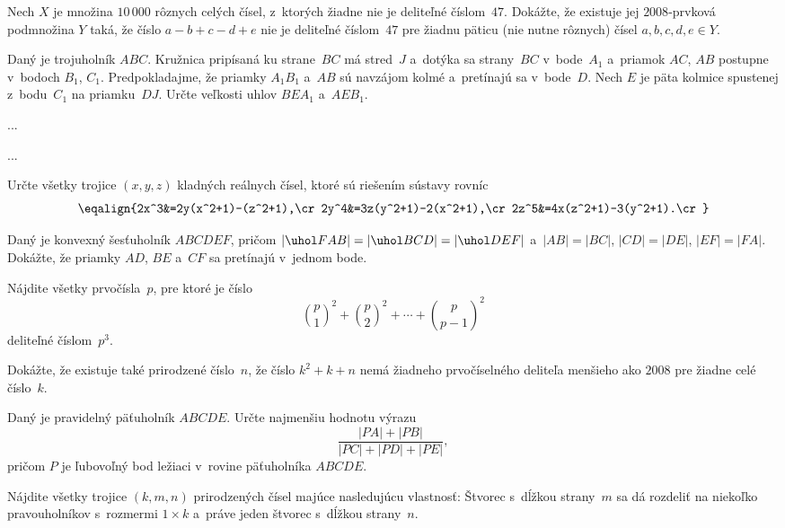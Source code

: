 {%
Nech $X$ je množina $10\,000$ rôznych celých čísel, z~ktorých žiadne nie je deliteľné číslom~$47$. Dokážte, že existuje jej $2008$-prvková podmnožina $Y$ taká, že číslo $a-b+c-d+e$ nie je deliteľné číslom~$47$ pre žiadnu päticu (nie nutne rôznych) čísel $a,b,c,d,e\in Y$.
}

{%
Daný je trojuholník $ABC$. Kružnica pripísaná ku strane~$BC$ má stred~$J$ a~dotýka sa strany~$BC$ v~bode~$A_1$ a~priamok $AC$, $AB$ postupne v~bodoch $B_1$, $C_1$. Predpokladajme, že priamky $A_1B_1$ a~$AB$ sú navzájom kolmé a~pretínajú sa v~bode~$D$. Nech $E$ je päta kolmice spustenej z~bodu~$C_1$ na priamku~$DJ$. Určte veľkosti uhlov $BEA_1$ a~$AEB_1$.}

{%
...}

{%
...}

{%
Určte všetky trojice $(x,y,z)$ kladných reálnych čísel, ktoré sú riešením sústavy rovníc
$$
\eqalign{2x^3&=2y(x^2+1)-(z^2+1),\cr
2y^4&=3z(y^2+1)-2(x^2+1),\cr
2z^5&=4x(z^2+1)-3(y^2+1).\cr}
$$}

{%
Daný je konvexný šesťuholník $ABCDEF$, pričom $|\uhol FAB|=|\uhol BCD|=|\uhol DEF|$ a~$|AB|=|BC|$, $|CD|=|DE|$, $|EF|=|FA|$. Dokážte, že priamky $AD$, $BE$ a~$CF$ sa pretínajú v~jednom bode.}

{%
Nájdite všetky prvočísla~$p$, pre ktoré je číslo
$$
\binom{p}{1}^2+\binom{p}{2}^2+\cdots+\binom{p}{p-1}^2
$$
deliteľné číslom~$p^3$.}

{%
Dokážte, že existuje také prirodzené číslo~$n$, že číslo $k^2+k+n$ nemá žiadneho prvočíselného deliteľa menšieho ako $2008$ pre žiadne celé číslo~$k$.}

{%
Daný je pravidelný päťuholník $ABCDE$. Určte najmenšiu hodnotu výrazu
$$
\frac{|PA|+|PB|}{|PC|+|PD|+|PE|},
$$
pričom $P$ je ľubovoľný bod ležiaci v~rovine päťuholníka $ABCDE$.}

{%
Nájdite všetky trojice $(k,m,n)$ prirodzených čísel majúce nasledujúcu vlastnosť:
Štvorec s~dĺžkou strany~$m$ sa dá rozdeliť na niekoľko pravouholníkov s~rozmermi $1\times k$ a~práve jeden štvorec s~dĺžkou strany~$n$.}

